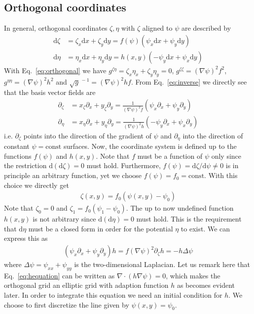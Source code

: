 \documentclass{hitec} %
\renewcommand{\d}{\mathrm{d}}
\begin{document}
\subsection{Orthogonal coordinates} \label{sec:orthogonal}
In general, orthogonal coordinates $\zeta, \eta$ with $\zeta$ aligned to $\psi$ are described by
\begin{subequations}
\begin{align}
  \d \zeta & = \zeta_x\d x +\zeta_y\d y =  f(\psi)(\psi_x \d x + \psi_y \d y) \\
  \d \eta  & = \eta_x \d x + \eta_y \d y = h(x,y) ( -\psi_y \d x + \psi_x \d y)
\end{align}
  \label{eq:orthogonal}
\end{subequations}
With Eq.~\eqref{eq:orthogonal} we have $g^{\zeta\eta} = \zeta_x\eta_x + \zeta_y\eta_y = 0$,
$g^{\zeta\zeta} = (\nabla\psi)^2 f^2$, $g^{\eta\eta} = (\nabla\psi)^2h^2$ and $\sqrt{g}^{\,-1} = (\nabla\psi)^2 h f$. 
From Eq.~\eqref{eq:inverse} we directly see that the basis vector fields are
\begin{subequations}
\begin{align}
  \partial_\zeta&= x_\zeta\partial_x + y_\zeta\partial_y = \frac{1}{(\nabla\psi)^2f} (\psi_x \partial_x + \psi_y\partial_y) \\
  \partial_\eta &=  x_\eta\partial_x + y_\eta\partial_y =  \frac{1}{(\nabla\psi)^2h} (-\psi_y \partial_x + \psi_x\partial_y) 
\label{eq:orthogonal_linesb}
\end{align}
\label{eq:orthogonal_lines}
\end{subequations}
i.e. $\partial_\zeta$ points into the direction of the gradient of $\psi$ and $\partial_\eta$ into the direction of constant $\psi=\text{const}$ surfaces.
Now, the coordinate system is defined up to the functions $f(\psi)$ and $h(x,y)$.
Note that $f$ must be a function of $\psi$ only since the restriction $\d(\d \zeta)=0$ must hold.
Furthermore, $f(\psi) = \d\zeta/ \d\psi \neq 0 $ is in principle an arbitrary function, yet we choose $f(\psi) = f_0 = \text{const}$.
With this choice we directly get
\begin{align}
  \zeta(x,y) = f_0(\psi(x,y)-\psi_0)
  \label{eq:zeta}
\end{align}
Note that $\zeta_0=0$ and $\zeta_1=f_0(\psi_1-\psi_0)$.
The up to now undefined function $h(x,y)$ is not arbitrary since $\d(\d \eta) = 0$ must hold. This is the requirement that $\d \eta$ must be
a closed form in order for the potential $\eta$ to exist. 
We can express this as
\begin{align}
  (\psi_x\partial_x + \psi_y\partial_y) h = f(\nabla\psi)^2 \partial_\zeta h= -h\Delta \psi 
  \label{eq:hequation}
\end{align}
where $\Delta \psi = \psi_{xx} + \psi_{yy}$ is the two-dimensional Laplacian.
Let us remark here that Eq.~\eqref{eq:hequation} can be written as $\nabla\cdot\left( h\nabla\psi \right)=0$, which makes the orthogonal grid an elliptic grid
with adaption function $h$ as becomes evident later. 
In order to integrate this equation we need an initial condition for $h$. 
We choose to first discretize the line given by $\psi(x,y) = \psi_0$. 
\end{document}
